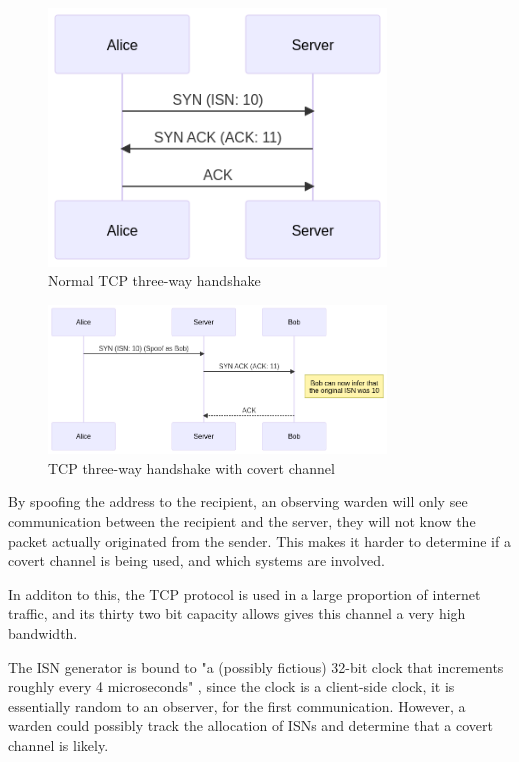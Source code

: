 \begin{figure}[!h]
    \centering
    \includegraphics[width=0.8\textwidth]{fig/TCPACKNormal.png}
    \caption{Normal TCP three-way handshake}
    \label{fig:TCPACKNormal}
\end{figure}

\begin{figure}[!h]
    \centering
    \includegraphics[width=0.8\textwidth]{fig/TCPACKCC.png}
    \caption{TCP three-way handshake with covert channel}
    \label{fig:TCPACKCC}
\end{figure}


By spoofing the address to the recipient, an observing warden will only see communication between the recipient and the server, they will not know the packet actually originated from the sender. This makes it harder to determine if a covert channel is being used, and which systems are involved.

In additon to this, the TCP protocol is used in a large proportion of internet traffic, and its thirty two bit capacity allows gives this channel a very high bandwidth.

The ISN generator is bound to "a (possibly fictious) 32-bit clock that increments roughly every 4 microseconds" \cite{Trfc793}, since the clock is a client-side clock, it is essentially random to an observer, for the first communication. However, a warden could possibly track the allocation of ISNs and determine that a covert channel is likely.

